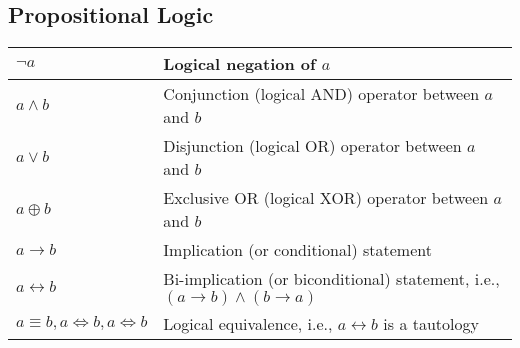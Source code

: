 \documentclass{article}
\begin{document}
\subsection{Propositional Logic}
\begin{xltabular}{\textwidth}{XX}
    \(\lnot a\) & Logical negation of \(a\) \cite{rosenDiscreteMathematicsIts2011}\\ \hline
    \(a \wedge b\) & Conjunction (logical AND) operator between \(a\) and \(b\)\cite{rosenDiscreteMathematicsIts2011}\\ \hline
    \(a \vee b\) & Disjunction (logical OR) operator between \(a\) and \(b\)\cite{rosenDiscreteMathematicsIts2011}\\ \hline
    \(a \oplus b\) & Exclusive OR (logical XOR) operator between \(a\) and \(b\)\cite{rosenDiscreteMathematicsIts2011}\\ \hline
    \(a \rightarrow b\) & Implication (or conditional) statement\cite{rosenDiscreteMathematicsIts2011}\\ \hline
    \(a \leftrightarrow b\) & Bi-implication (or biconditional) statement, i.e., \(\left( a \rightarrow b \right) \wedge (b \rightarrow a )\) \cite{rosenDiscreteMathematicsIts2011}\\ \hline
    \(a \equiv b, a \iff b, a \Leftrightarrow b \) & Logical equivalence, i.e., \(a \leftrightarrow b\) is a tautology\cite{rosenDiscreteMathematicsIts2011}\\
\end{xltabular}
\end{document}
